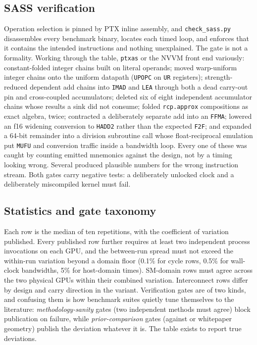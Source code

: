 \subsection{SASS verification}
\label{sec:sass}

Operation selection is pinned by PTX inline assembly, and
\texttt{check\_sass.py} disassembles every benchmark binary, locates each
timed loop, and enforces that it contains the intended instructions and
nothing unexplained. The gate is not a formality. Working through the
table, \texttt{ptxas} or the NVVM front end variously: constant-folded
integer chains built on literal operands; moved warp-uniform integer
chains onto the uniform datapath (\texttt{UPOPC} on \texttt{UR}
registers); strength-reduced dependent add chains into \texttt{IMAD} and
\texttt{LEA} through both a dead carry-out pin and cross-coupled
accumulators; deleted six of eight independent accumulator chains whose
results a sink did not consume; folded \texttt{rcp.approx} compositions
as exact algebra, twice; contracted a deliberately separate add into an
\texttt{FFMA}; lowered an f16 widening conversion to \texttt{HADD2}
rather than the expected \texttt{F2F}; and expanded a 64-bit remainder
into a division subroutine call whose float-reciprocal emulation put
\texttt{MUFU} and conversion traffic inside a bandwidth loop. Every one
of these was caught by counting emitted mnemonics against the design,
not by a timing looking wrong. Several produced plausible numbers for
the wrong instruction stream. Both gates carry negative tests: a
deliberately unlocked clock and a deliberately miscompiled kernel must
fail.

\subsection{Statistics and gate taxonomy}

Each row is the median of ten repetitions, with the coefficient of
variation published. Every published row further requires at least two
independent process invocations on each GPU, and the between-run spread
must not exceed the within-run variation beyond a domain floor (0.1\% for
cycle rows, 0.5\% for wall-clock bandwidths, 5\% for host-domain times).
SM-domain rows must agree across the two physical GPUs within their
combined variation. Interconnect rows differ by design and carry
direction in the variant. Verification gates are of two kinds, and
confusing them is how benchmark suites quietly tune themselves to the
literature: \emph{methodology-sanity} gates (two independent methods must
agree) block publication on failure, while \emph{prior-comparison} gates
(against \citealp{jia2019turing} or whitepaper geometry) publish the
deviation whatever it is. The table exists to report true deviations.

